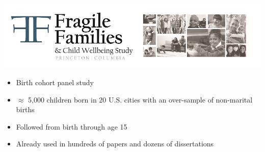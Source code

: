 \documentclass{beamer}
\begin{document}
\begin{frame}

\begin{center}
\includegraphics[width=\textwidth]{figures/ff_logo}
\end{center}

\begin{itemize}
\item Birth cohort panel study
\item $\approx$ 5,000 children born in 20 U.S. cities with an over-sample of non-marital births
\item Followed from birth through age 15
\item Already used in hundreds of papers and dozens of dissertations
\end{itemize}

\end{frame}
\end{document}
